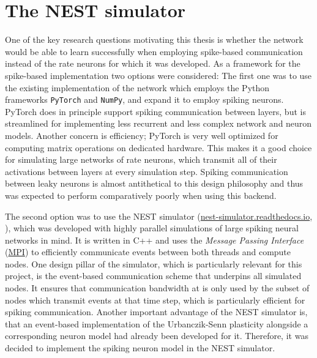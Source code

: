 \section{The NEST simulator}

One of the key research questions motivating this thesis is whether the network would be able to learn successfully when
employing spike-based communication instead of the rate neurons for which it was developed. As a framework for the
spike-based implementation two options were considered: The first one was to use the existing implementation of the
network which employs the Python frameworks \texttt{PyTorch} and \texttt{NumPy}, and expand it to employ spiking
neurons. PyTorch does in principle support spiking communication between layers, but is streamlined for implementing
less recurrent and less complex network and neuron models. Another concern is efficiency; PyTorch is very well optimized
for computing matrix operations on dedicated hardware. This makes it a good choice for simulating large networks of rate
neurons, which transmit all of their activations between layers at every simulation step. Spiking communication between
leaky neurons is almost antithetical to this design philosophy and thus was expected to perform comparatively poorly
when using this backend.

The second option was to use the NEST simulator
(\href{https://nest-simulator.readthedocs.io}{nest-simulator.readthedocs.io}, \cite{Gewaltig2007}), which was developed
with highly parallel simulations of large spiking neural networks in mind. It is written in C++ and uses the
\textit{Message Passing Interface} (\href{https://www.mpi-forum.org/}{MPI}) to efficiently communicate events between
both threads and compute nodes. One design pillar of the simulator, which is particularly relevant for this project, is
the event-based communication scheme that underpins all simulated nodes. It ensures that communication bandwidth at is
only used by the subset of nodes which transmit events at that time step, which is particularly efficient for spiking
communication. Another important advantage of the NEST simulator is, that an event-based implementation of the
Urbanczik-Senn plasticity alongside a corresponding neuron model had already been developed for it. Therefore, it was
decided to implement the spiking neuron model in the NEST simulator.

